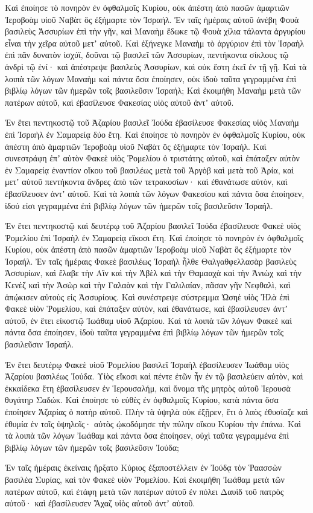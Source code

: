 {Καὶ ἐποίησε τὸ πονηρὸν ἐν ὀφθαλμοῖς Κυρίου, οὐκ ἀπέστη ἀπὸ πασῶν ἁμαρτιῶν Ἱεροβοὰμ υἱοῦ Ναβὰτ ὃς ἐξήμαρτε τὸν Ἰσραήλ.
Ἐν ταῖς ἡμέραις αὐτοῦ ἀνέβη Φουὰ βασιλεὺς Ἀσσυρίων ἐπὶ τὴν γῆν, καὶ Μαναὴμ ἔδωκε τῷ Φουὰ χίλια τάλαντα ἀργυρίου εἶναι τὴν χεῖρα αὐτοῦ μετʼ αὐτοῦ.
Καὶ ἐξήνεγκε Μαναὴμ τὸ ἀργύριον ἐπὶ τὸν Ἰσραὴλ ἐπὶ πᾶν δυνατὸν ἰσχύϊ, δοῦναι τῷ βασιλεῖ τῶν Ἀσσυρίων, πεντήκοντα σίκλους τῷ ἀνδρὶ τῷ ἑνί· καὶ ἀπέστρεψε βασιλεὺς Ἀσσυρίων, καὶ οὐκ ἔστη ἐκεῖ ἐν τῇ γῇ.
Καὶ τὰ λοιπὰ τῶν λόγων Μαναὴμ καὶ πάντα ὅσα ἐποίησεν, οὐκ ἰδοὺ ταῦτα γεγραμμένα ἐπὶ βιβλίῳ λόγων τῶν ἡμερῶν τοῖς βασιλεῦσιν Ἰσραήλ;
Καὶ ἐκοιμήθη Μαναὴμ μετὰ τῶν πατέρων αὐτοῦ, καὶ ἐβασίλευσε Φακεσίας υἱὸς αὐτοῦ ἀντʼ αὐτοῦ.
\par }{\PP {}Ἐν ἔτει πεντηκοστῷ τοῦ Ἀζαρίου βασιλεῖ Ἰούδα ἐβασίλευσε Φακεσίας υἱὸς Μαναὴμ ἐπὶ Ἰσραὴλ ἐν Σαμαρείᾳ δύο ἔτη.
Καὶ ἐποίησε τὸ πονηρὸν ἐν ὀφθαλμοῖς Κυρίου, οὐκ ἀπέστη ἀπὸ ἁμαρτιῶν Ἰεροβοὰμ υἱοῦ Ναβὰτ ὃς ἐξήμαρτε τὸν Ἰσραήλ.
Καὶ συνεστράφη ἐπʼ αὐτὸν Φακεὲ υἱὸς Ῥομελίου ὁ τριστάτης αὐτοῦ, καὶ ἐπάταξεν αὐτὸν ἐν Σαμαρείᾳ ἐναντίον οἴκου τοῦ βασιλέως μετὰ τοῦ Ἀργὸβ καὶ μετὰ τοῦ Ἀρία, καὶ μετʼ αὐτοῦ πεντήκοντα ἄνδρες ἀπὸ τῶν τετρακοσίων· καὶ ἐθανάτωσε αὐτὸν, καὶ ἐβασίλευσεν ἀντʼ αὐτοῦ.
Καὶ τὰ λοιπὰ τῶν λόγων Φακεσίου καὶ πάντα ὅσα ἐποίησεν, ἰδού εἰσι γεγραμμένα ἐπὶ βιβλίῳ λόγων τῶν ἡμερῶν τοῖς βασιλεῦσιν Ἰσραήλ.
\par }{\PP {}Ἐν ἔτει πεντηκοστῷ καὶ δευτέρῳ τοῦ Ἀζαρίου βασιλεῖ Ἰούδα ἐβασίλευσε Φακεὲ υἱὸς Ῥομελίου ἐπὶ Ἰσραὴλ ἐν Σαμαρείᾳ εἴκοσι ἔτη.
Καὶ ἐποίησε τὸ πονηρὸν ἐν ὀφθαλμοῖς Κυρίου, οὐκ ἀπέστη ἀπὸ πασῶν ἁμαρτιῶν Ἰεροβοὰμ υἱοῦ Ναβὰτ ὃς ἐξήμαρτε τὸν Ἰσραήλ.
Ἐν ταῖς ἡμέραις Φακεὲ βασιλέως Ἰσραὴλ ἦλθε Θαλγαθφελλασὰρ βασιλεὺς Ἀσσυρίων, καὶ ἔλαβε τὴν Αἲν καὶ τὴν Ἀβὲλ καὶ τὴν Θαμααχὰ καὶ τὴν Ἀνιὼχ καὶ τὴν Κενὲζ καὶ τὴν Ἀσὼρ καὶ τὴν Γαλαὰν καὶ τὴν Γαλιλαίαν, πᾶσαν γῆν Νεφθαλὶ, καὶ ἀπῴκισεν αὐτοὺς εἰς Ἀσσυρίους.
Καὶ συνέστρεψε σύστρεμμα Ὠσηὲ υἱὸς Ἠλὰ ἐπὶ Φακεὲ υἱὸν Ῥομελίου, καὶ ἐπάταξεν αὐτὸν, καὶ ἐθανάτωσε, καὶ ἐβασίλευσεν ἀντʼ αὐτοῦ, ἐν ἔτει εἰκοστῷ Ἰωάθαμ υἱοῦ Ἀζαρίου.
Καὶ τὰ λοιπὰ τῶν λόγων Φακεὲ καὶ πάντα ὅσα ἐποίησεν, ἰδοὺ ταῦτα γεγραμμένα ἐπὶ βιβλίῳ λόγων τῶν ἡμερῶν τοῖς βασιλεῦσιν Ἰσραήλ.
\par }{\PP {}Ἐν ἔτει δευτέρῳ Φακεὲ υἱοῦ Ῥομελίου βασιλεῖ Ἰσραὴλ ἐβασίλευσεν Ἰωάθαμ υἱὸς Ἀζαρίου βασιλέως Ἰούδα.
Υἱὸς εἴκοσι καὶ πέντε ἐτῶν ἦν ἐν τῷ βασιλεύειν αὐτὸν, καὶ ἐκκαίδεκα ἔτη ἐβασίλευσεν ἐν Ἱερουσαλήμ, καὶ ὄνομα τῆς μητρὸς αὐτοῦ Ἰερουσὰ θυγάτηρ Σαδώκ.
Καὶ ἐποίησε τὸ εὐθὲς ἐν ὀφθαλμοῖς Κυρίου, κατὰ πάντα ὅσα ἐποίησεν Ἀζαρίας ὁ πατὴρ αὐτοῦ.
Πλὴν τὰ ὑψηλὰ οὐκ ἐξῇρεν, ἔτι ὁ λαὸς ἐθυσίαζε καὶ ἐθυμία ἐν τοῖς ὑψηλοῖς· αὐτὸς ᾠκοδόμησε τὴν πύλην οἴκου Κυρίου τὴν ἐπάνω.
Καὶ τὰ λοιπὰ τῶν λόγων Ἰωάθαμ καὶ πάντα ὅσα ἐποίησεν, οὐχὶ ταῦτα γεγραμμένα ἐπὶ βιβλίῳ λόγων τῶν ἡμερῶν τοῖς βασιλεῦσιν Ἰούδα;
\par }{\PP {}Ἐν ταῖς ἡμέραις ἐκείναις ἤρξατο Κύριος ἐξαποστέλλειν ἐν Ἰούδᾳ τὸν Ῥαασσὼν βασιλέα Συρίας, καὶ τὸν Φακεὲ υἱὸν Ῥομελίου.
Καὶ ἐκοιμήθη Ἰωάθαμ μετὰ τῶν πατέρων αὐτοῦ, καὶ ἐτάφη μετὰ τῶν πατέρων αὐτοῦ ἐν πόλει Δαυὶδ τοῦ πατρὸς αὐτοῦ· καὶ ἐβασίλευσεν Ἄχαζ υἱὸς αὐτοῦ ἀντʼ αὐτοῦ.

}
